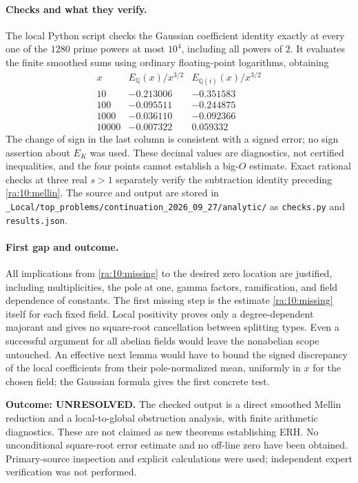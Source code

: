 \documentclass[11pt]{article}
\begin{document}
\paragraph{Checks and what they verify.}
The local Python script checks the Gaussian coefficient identity exactly
at every one of the $1280$ prime powers at most $10^4$, including all powers
of $2$. It evaluates the finite smoothed sums using ordinary floating-point
logarithms, obtaining
\[
\begin{array}{r|rr}
x&E_{\mathbb Q}(x)/x^{3/2}&E_{\mathbb Q(i)}(x)/x^{3/2}\\\hline
10&-0.213006&-0.351583\\
100&-0.095511&-0.244875\\
1000&-0.036110&-0.092366\\
10000&-0.007322&0.059332
\end{array}
\]
The change of sign in the last column is consistent with a signed error;
no sign assertion about $E_K$ was used. These decimal values are diagnostics,
not certified inequalities, and the four points cannot establish a
big-$O$ estimate. Exact rational checks at three real $s>1$ separately
verify the subtraction identity preceding \eqref{ra:10:mellin}.
The source and output are stored in
\texttt{\_Local/top\_problems/continuation\_2026\_09\_27/analytic/}
as \texttt{checks.py} and \texttt{results.json}.

\paragraph{First gap and outcome.}
All implications from \eqref{ra:10:missing} to the desired zero location
are justified, including multiplicities, the pole at one, gamma factors,
ramification, and field dependence of constants. The first missing step
is the estimate \eqref{ra:10:missing} itself for each fixed field.
Local positivity proves only a degree-dependent majorant and gives no
square-root cancellation between splitting types. Even a successful
argument for all abelian fields would leave the nonabelian scope untouched.
An effective next lemma would have to bound the signed discrepancy of
the local coefficients from their pole-normalized mean, uniformly in $x$
for the chosen field; the Gaussian formula gives the first concrete test.

\textbf{Outcome: UNRESOLVED.} The checked output is a direct smoothed
Mellin reduction and a local-to-global obstruction analysis, with finite
arithmetic diagnostics. These are not claimed as new theorems establishing
ERH. No unconditional square-root error estimate and no off-line zero have
been obtained. Primary-source inspection and explicit calculations were
used; independent expert verification was not performed.
\end{document}
